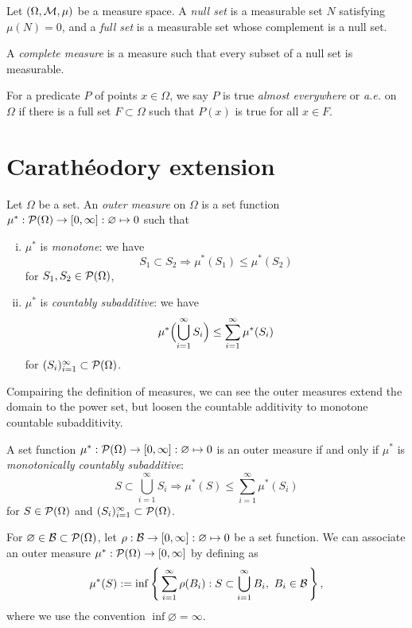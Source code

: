 \documentclass{../../large}
\begin{document}
\begin{prb}
Let $(\Omega,\mathcal{M},\mu)$ be a measure space.
A \emph{null set} is a measurable set $N$ satisfying $\mu(N)=0$, and a \emph{full set} is a measurable set whose complement is a null set.

A \emph{complete measure} is a measure such that every subset of a null set is measurable.

For a predicate $P$ of points $x\in\Omega$, we say $P$ is true \emph{almost everywhere} or \emph{a.e.} on $\Omega$ if there is a full set $F\subset\Omega$ such that $P(x)$ is true for all $x\in F$.
\end{prb}



\section{Carath\'eodory extension}

\begin{prb}
Let $\Omega$ be a set.
An \emph{outer measure} on $\Omega$ is a set function $\mu^*:\mathcal{P}(\Omega)\to[0,\infty]:\varnothing\mapsto0$ such that
\begin{enumerate}[(i)]
\item $\mu^*$ is \emph{monotone}: we have
\[S_1\subset S_2\Rightarrow\mu^*(S_1)\le\mu^*(S_2)\]
for $S_1,S_2\in\mathcal{P}(\Omega)$,
\item $\mu^*$ is \emph{countably subadditive}: we have
\[\mu^*\Bigl(\bigcup_{i=1}^\infty S_i\Bigr)\le\sum_{i=1}^\infty\mu^*(S_i)\]
for $(S_i)_{i=1}^\infty\subset\mathcal{P}(\Omega)$.
\end{enumerate}
Compairing the definition of measures, we can see the outer measures extend the domain to the power set, but loosen the countable additivity to monotone countable subadditivity.
\begin{parts}
\item A set function $\mu^*:\mathcal{P}(\Omega)\to[0,\infty]:\varnothing\mapsto0$ is an outer measure if and only if $\mu^*$ is \emph{monotonically countably subadditive}:
\[S\subset\bigcup_{i=1}^\infty S_i\Rightarrow\mu^*(S)\le\sum_{i=1}^\infty\mu^*(S_i)\]
for $S\in\mathcal{P}(\Omega)$ and $(S_i)_{i=1}^\infty\subset\mathcal{P}(\Omega)$.
\item
For $\varnothing\in\mathcal{B}\subset\mathcal{P}(\Omega)$, let $\rho:\mathcal{B}\to[0,\infty]:\varnothing\mapsto0$ be a set function.
We can associate an outer measure $\mu^*:\mathcal{P}(\Omega)\to[0,\infty]$ by defining as
\[\mu^*(S):=\inf\left\{\,\sum_{i=1}^\infty\rho(B_i):S\subset\bigcup_{i=1}^\infty B_i,\ B_i\in\mathcal{B}\,\right\},\]
where we use the convention $\inf\varnothing=\infty$.
\end{parts}
\end{prb}
\begin{pf}
\end{pf}
\end{document}
